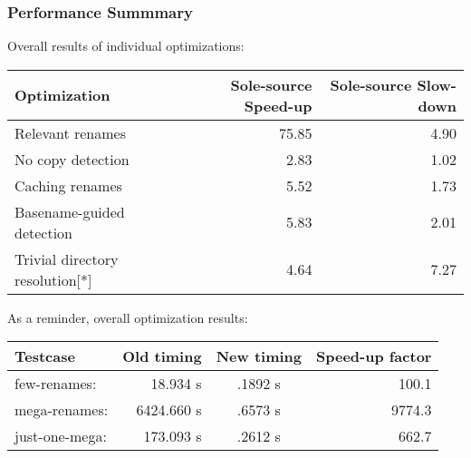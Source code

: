 \documentclass[compress,t]{beamer}
\begin{document}
\begin{frame}
  \frametitle{Performance Summmary}

  Overall results of individual optimizations:\\
  \pause
  \vspace*{0.5\baselineskip}
  \qquad
  \begin{tabular}{l|r|r}
    Optimization                    &
      \multicolumn{1}{p{5.5em}}{\centering Sole-source Speed-up}  &
      \multicolumn{1}{|p{5.5em}}{\centering Sole-source Slow-down} \\
    \hline
    Relevant renames                & 75.85\hspace*{1.4em} & 4.90 \hspace*{1.4em} \\
    No copy detection               &  2.83\hspace*{1.4em} & 1.02 \hspace*{1.4em} \\
    Caching renames                 &  5.52\hspace*{1.4em} & 1.73 \hspace*{1.4em} \\
    Basename-guided detection       &  5.83\hspace*{1.4em} & 2.01 \hspace*{1.4em} \\
    Trivial directory resolution[*] &  4.64\hspace*{1.4em} & 7.27 \hspace*{1.4em}
  \end{tabular}

  \pause
  \vspace*{1.5\baselineskip}
  As a reminder, overall optimization results:\\
  \vspace*{0.5\baselineskip}
  \qquad
  \begin{tabular}{l|r|c|r}
    Testcase       & \multicolumn{1}{c|}{Old timing}
                   & \multicolumn{1}{c|}{New timing}
                   & \multicolumn{1}{p{4.4em}}{\centering Speed-up factor} \\
    \hline
    few-renames:   &   18.934 s & .1892 s &  100.1 \hspace*{0.3em} \\
    mega-renames:  & 6424.660 s & .6573 s & 9774.3 \hspace*{0.3em} \\
    just-one-mega: &  173.093 s & .2612 s &  662.7 \hspace*{0.3em}
  \end{tabular}

\end{frame}
\end{document}
